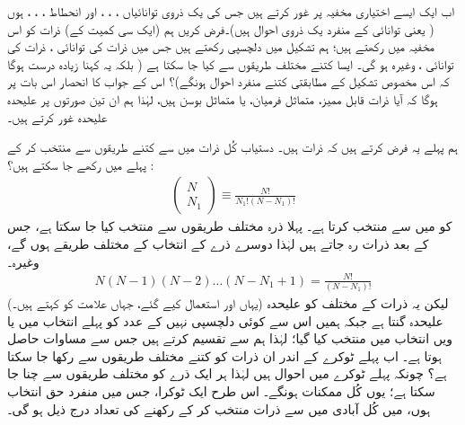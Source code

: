  اب ایک ایسے اختیاری مخفیہ پر غور کرتے ہیں جس کی یک ذروی توانائیاں ، ، ،  اور انحطاط ، ، ،  ہوں ( یعنی توانائی  کے  منفرد یک ذروی احوال ہیں)۔فرض کریں ہم (ایک سی  کمیت کے)  ذرات کو اس ‏مخفیہ میں رکھتے ہیں؛ ہم تشکیل  میں دلچسپی رکھتے ہیں جس میں  ذرات کی توانائی ،  ذرات کی توانائی ، وغیرہ ہو گی۔ ایسا کتنے مختلف طریقوں سے کیا جا سکتا ہے ( بلکہ یہ کہنا زیادہ درست ہوگا کہ اس مخصوص تشکیل کے مطابقتی کتنے منفرد احوال ہونگے)؟ اس کے جواب  کا انحصار اس بات پر ہوگا کہ آیا ذرات قابل ممیز، متماثل فرميان، یا متماثل بوسن ہیں، لہٰذا ہم ان تین صورتوں پر علیحدہ علیحدہ غور کرتے ہیں۔
 
 ہم پہلے یہ فرض کرتے ہیں کہ ذرات  ہیں۔ دستیاب کُل  ذرات میں سے کتنے طریقوں سے  منتخب کر کے پہلے  میں رکھے جا سکتے ہیں؟  :
\begin{align}\label{مساوات_متماثل_ثنائی_عددی_سر_پہلا}
\begin{pmatrix}
N \\
N_1
\end{pmatrix}
\equiv \frac{N!}{N_1 ! (N - N_1) !}
\end{align}
  کو  میں سے منتخب کرتا ہے۔ پہلا ذرہ  مختلف طریقوں سے منتخب کیا جا سکتا ہے، جس کے بعد  ذرات رہ جاتے ہیں لہٰذا دوسرے ذرے کے انتخاب کے  مختلف طریقے ہوں گے، وغیرہ۔ 
\begin{align*}
N(N - 1) (N - 2) \dotsc (N - N_1 + 1) = \frac{N !}{(N - N_1) !}
\end{align*}
(یہاں  اور  استعمال کیے گئے،  جہاں علامت  کو  کہتے ہیں۔) لیکن یہ  ذرات کے  مختلف  کو علیحدہ علیحدہ گنتا ہے جبکہ ہمیں اس سے کوئی دلچسپی نہیں کے عدد  کو پہلے انتخاب میں یا  ویں انتخاب میں منتخب کیا گیا؛ لہٰذا ہم  سے تقسیم کرتے ہیں جس سے مساوات  حاصل ہوتا ہے۔ اب پہلے ٹوکرے کے اندر ان  ذرات کو کتنے مختلف طریقوں سے رکھا جا سکتا ہے؟ چونکہ پہلے ٹوکرے میں  احوال ہیں لہٰذا ہر ایک ذرے کو  مختلف طریقوں سے چنا جا سکتا ہے؛ یوں کُل ممکنات  ہونگے۔ اس طرح ایک ٹوکرا، جس میں  منفرد حق انتخاب ہوں، میں کُل آبادی  میں سے  ذرات منتخب کر کے رکھنے کی تعداد درج ذیل ہو گی۔ 
